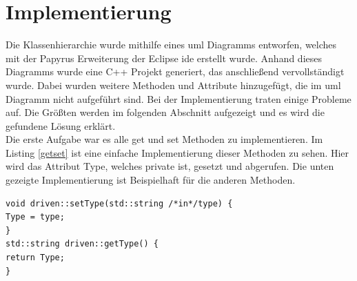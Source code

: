 \section{Implementierung}\label{implement}
Die Klassenhierarchie wurde mithilfe eines \ac{uml} Diagramms entworfen, welches mit der Papyrus Erweiterung der Eclipse \ac{ide} erstellt wurde. Anhand dieses Diagramms wurde eine C++ Projekt generiert, das anschließend vervollständigt wurde. Dabei wurden weitere Methoden und Attribute hinzugefügt, die im \ac{uml} Diagramm nicht aufgeführt sind. Bei der Implementierung traten einige Probleme auf. Die Größten werden im folgenden Abschnitt aufgezeigt und es wird die gefundene Lösung erklärt.\\
Die erste Aufgabe war es alle \glqq get\grqq{} und \glqq set\grqq{} Methoden zu implementieren.  
Im Listing \ref{getset} ist eine einfache Implementierung dieser Methoden zu sehen. Hier wird das Attribut \glqq Type\grqq{}, welches \glqq private\grqq{} ist, gesetzt und abgerufen. Die unten gezeigte Implementierung ist Beispielhaft für die anderen Methoden. 
\begin{lstlisting}[caption =\glqq get\grqq{} und \glqq set\grqq{} Methode ,label=getset]
void driven::setType(std::string /*in*/type) {
Type = type;
}
std::string driven::getType() {
return Type;
}
\end{lstlisting}

